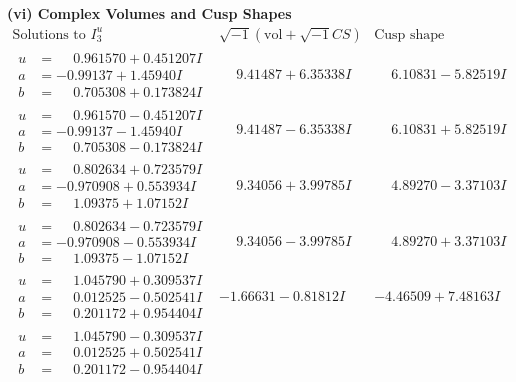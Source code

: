 \documentclass[1p]{elsarticle_modified}
\theoremstyle{definition}
\newcommand{\I}{\sqrt{-1}}
\begin{document}
\newpage\flushleft \textbf{(vi) Complex Volumes and Cusp Shapes}
$$\begin{array}{c|c|c}  
\text{Solutions to }I^u_{3}& \I (\text{vol} + \sqrt{-1}CS) & \text{Cusp shape}\\
 \hline 
\begin{aligned}
u &= \phantom{-}0.961570 + 0.451207 I \\
a &= -0.99137 + 1.45940 I \\
b &= \phantom{-}0.705308 + 0.173824 I\end{aligned}
 & \phantom{-}9.41487 + 6.35338 I & \phantom{-}6.10831 - 5.82519 I \\ \hline\begin{aligned}
u &= \phantom{-}0.961570 - 0.451207 I \\
a &= -0.99137 - 1.45940 I \\
b &= \phantom{-}0.705308 - 0.173824 I\end{aligned}
 & \phantom{-}9.41487 - 6.35338 I & \phantom{-}6.10831 + 5.82519 I \\ \hline\begin{aligned}
u &= \phantom{-}0.802634 + 0.723579 I \\
a &= -0.970908 + 0.553934 I \\
b &= \phantom{-}1.09375 + 1.07152 I\end{aligned}
 & \phantom{-}9.34056 + 3.99785 I & \phantom{-}4.89270 - 3.37103 I \\ \hline\begin{aligned}
u &= \phantom{-}0.802634 - 0.723579 I \\
a &= -0.970908 - 0.553934 I \\
b &= \phantom{-}1.09375 - 1.07152 I\end{aligned}
 & \phantom{-}9.34056 - 3.99785 I & \phantom{-}4.89270 + 3.37103 I \\ \hline\begin{aligned}
u &= \phantom{-}1.045790 + 0.309537 I \\
a &= \phantom{-}0.012525 - 0.502541 I \\
b &= \phantom{-}0.201172 + 0.954404 I\end{aligned}
 & -1.66631 - 0.81812 I & -4.46509 + 7.48163 I \\ \hline\begin{aligned}
u &= \phantom{-}1.045790 - 0.309537 I \\
a &= \phantom{-}0.012525 + 0.502541 I \\
b &= \phantom{-}0.201172 - 0.954404 I\end{aligned}

\end{array}$$
\end{document}
